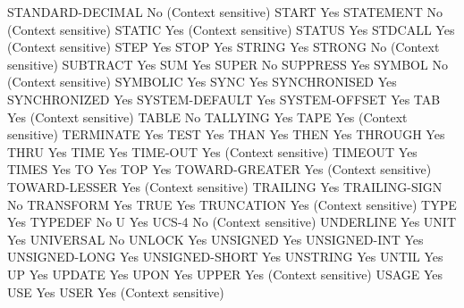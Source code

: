 STANDARD-DECIMAL                No (Context sensitive)
START                           Yes
STATEMENT                       No (Context sensitive)
STATIC                          Yes (Context sensitive)
STATUS                          Yes
STDCALL                         Yes (Context sensitive)
STEP                            Yes
STOP                            Yes
STRING                          Yes
STRONG                          No (Context sensitive)
SUBTRACT                        Yes
SUM                             Yes
SUPER                           No
SUPPRESS                        Yes
SYMBOL                          No (Context sensitive)
SYMBOLIC                        Yes
SYNC                            Yes
SYNCHRONISED                    Yes
SYNCHRONIZED                    Yes
SYSTEM-DEFAULT                  Yes
SYSTEM-OFFSET                   Yes
TAB                             Yes (Context sensitive)
TABLE                           No
TALLYING                        Yes
TAPE                            Yes (Context sensitive)
TERMINATE                       Yes
TEST                            Yes
THAN                            Yes
THEN                            Yes
THROUGH                         Yes
THRU                            Yes
TIME                            Yes
TIME-OUT                        Yes (Context sensitive)
TIMEOUT                         Yes
TIMES                           Yes
TO                              Yes
TOP                             Yes
TOWARD-GREATER                  Yes (Context sensitive)
TOWARD-LESSER                   Yes (Context sensitive)
TRAILING                        Yes
TRAILING-SIGN                   No
TRANSFORM                       Yes
TRUE                            Yes
TRUNCATION                      Yes (Context sensitive)
TYPE                            Yes
TYPEDEF                         No
U                               Yes
UCS-4                           No (Context sensitive)
UNDERLINE                       Yes
UNIT                            Yes
UNIVERSAL                       No
UNLOCK                          Yes
UNSIGNED                        Yes
UNSIGNED-INT                    Yes
UNSIGNED-LONG                   Yes
UNSIGNED-SHORT                  Yes
UNSTRING                        Yes
UNTIL                           Yes
UP                              Yes
UPDATE                          Yes
UPON                            Yes
UPPER                           Yes (Context sensitive)
USAGE                           Yes
USE                             Yes
USER                            Yes (Context sensitive)

